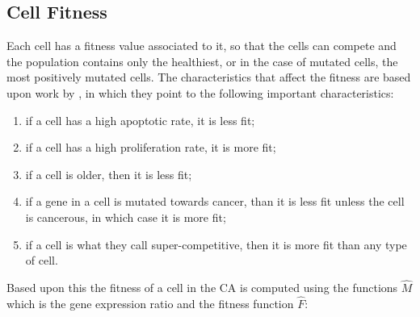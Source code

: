 \documentclass[\main/thesis.tex]{subfiles}
\begin{document}
\subsection{Cell Fitness}
Each cell has a fitness value associated to it, so that the cells can compete and
the population contains only the healthiest, or in the case of mutated cells,
the most positively mutated cells. The characteristics that affect the fitness are
based upon work by \textcite{Bowling}, in which they point to the following
important characteristics:
\begin{enumerate}
\item if a cell has a high apoptotic rate, it is less fit;
\item if a cell has a high proliferation rate, it is more fit;
\item if a cell is older, then it is less fit;
\item if a gene in a cell is mutated towards cancer, than it is less fit unless
      the cell is cancerous, in which case it is more fit;
\item if a cell is what they call super-competitive, then it is more fit than any type of cell.
\end{enumerate}
Based upon this the fitness of a cell in the CA is computed using the functions $\hat{M}$ which is the gene expression ratio and the fitness function $\hat{F}$:
\end{document}
